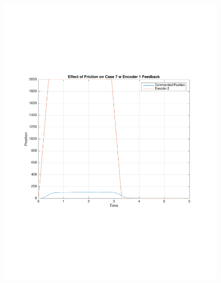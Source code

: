\documentclass[11pt, a4paper]{article}
\begin{document}
\begin{figure}[H]
\centering
\includegraphics[width = \textwidth]{7_tc7_fric.pdf}
\end{figure}
\end{document}
